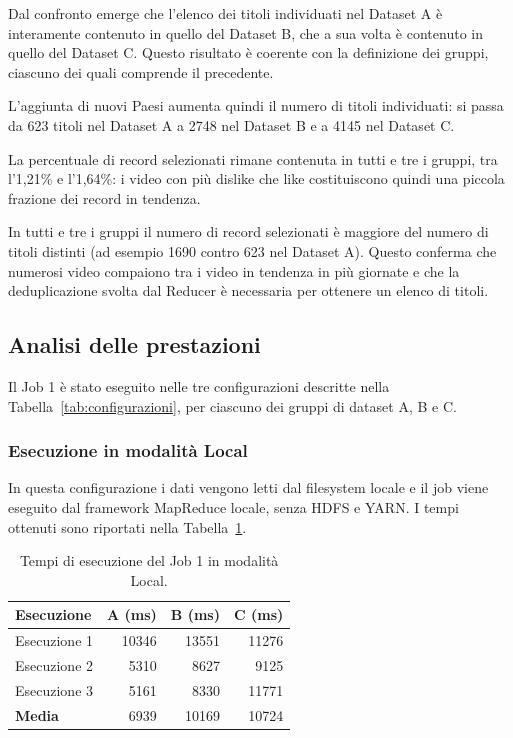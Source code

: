 \documentclass[12pt, a4paper]{article}
\begin{document}
Dal confronto emerge che l'elenco dei titoli
individuati nel Dataset A è interamente contenuto
in quello del Dataset B, che a sua volta è contenuto
in quello del Dataset C.
Questo risultato è coerente con la definizione dei gruppi,
ciascuno dei quali comprende il precedente.

L'aggiunta di nuovi Paesi aumenta quindi
il numero di titoli individuati: si passa
da 623 titoli nel Dataset A a 2748 nel Dataset B
e a 4145 nel Dataset C.

La percentuale di record selezionati
rimane contenuta in tutti e tre i gruppi,
tra l'1,21\% e l'1,64\%: i video con più
dislike che like costituiscono quindi
una piccola frazione dei record in tendenza.

In tutti e tre i gruppi il numero di record selezionati
è maggiore del numero di titoli distinti
(ad esempio 1690 contro 623 nel Dataset A).
Questo conferma che numerosi video compaiono
tra i video in tendenza in più giornate
e che la deduplicazione svolta dal Reducer
è necessaria per ottenere un elenco di titoli.

\subsection{Analisi delle prestazioni}

Il Job 1 è stato eseguito nelle tre configurazioni
descritte nella Tabella~\ref{tab:configurazioni},
per ciascuno dei gruppi di dataset A, B e C.

\subsubsection{Esecuzione in modalità Local}

In questa configurazione i dati vengono letti
dal filesystem locale e il job viene eseguito
dal framework MapReduce locale, senza HDFS e YARN.
I tempi ottenuti sono riportati nella
Tabella~\ref{tab:job1local}.

\begin{table}[H]
\centering
\small
\begin{tabular}{|l|r|r|r|}
\hline
\textbf{Esecuzione} &
\textbf{A (ms)} &
\textbf{B (ms)} &
\textbf{C (ms)} \\
\hline
Esecuzione 1 & 10346 & 13551 & 11276 \\
Esecuzione 2 & 5310 & 8627 & 9125 \\
Esecuzione 3 & 5161 & 8330 & 11771 \\
\hline
\textbf{Media} & 6939 & 10169 & 10724 \\
\hline
\end{tabular}
\caption{Tempi di esecuzione del Job 1 in modalità Local.}
\label{tab:job1local}
\end{table}
\end{document}
